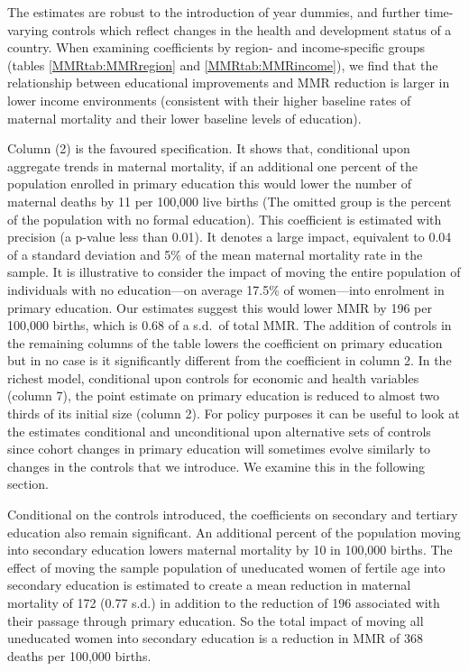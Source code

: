 \documentclass{article}[12pt,subeqn]
\begin{document}
\begin{spacing}{1.4}
The estimates are robust to the introduction of year dummies, and further 
time-varying controls which reflect changes in the health and development status 
of a country. When examining coefficients by region- and income-specific groups 
(tables \ref{MMRtab:MMRregion} and \ref{MMRtab:MMRincome}), we find that the 
relationship between educational improvements and MMR reduction is larger in lower 
income environments (consistent with their higher baseline rates of maternal 
mortality and their lower baseline levels of education).

Column (2) is the favoured specification. It shows that, conditional upon 
aggregate trends in maternal mortality, if an additional one percent of the 
population enrolled in primary education this would lower the number of maternal 
deaths by 11 per 100,000 live births (The omitted group is the percent of the
population with no formal education). This coefficient is estimated with 
precision (a p-value less than 0.01). It denotes a large impact, equivalent to 
0.04 of a standard deviation and 5\% of the mean maternal mortality rate in the 
sample. It is illustrative to consider the impact of moving the entire population 
of individuals with no education---on average 17.5\% of women---into enrolment in 
primary education. Our estimates suggest this would lower MMR by 196 per 100,000 
births, which is 0.68 of a s.d.\ of total MMR. The addition of controls in the 
remaining columns of the table lowers the coefficient on primary education but in 
no case is it significantly different from the coefficient in column 2. In the 
richest model, conditional upon controls for economic and health variables (column 
7), the point estimate on primary education is reduced to almost two thirds of its 
initial size (column 2). For policy purposes it can be useful to look at the 
estimates conditional and unconditional upon alternative sets of controls since 
cohort changes in primary education will sometimes evolve similarly to changes in 
the controls that we introduce. We examine this in the following section.

Conditional on the controls introduced, the coefficients on secondary and tertiary 
education also remain significant. An additional percent of the population moving 
into secondary education lowers maternal mortality by 10 in 100,000 births. The 
effect of moving the sample population of uneducated women of fertile age into 
secondary education is estimated to create a mean reduction in maternal mortality 
of 172 (0.77 s.d.) in addition to the reduction of 196 associated with their passage 
through primary education. So the total impact of moving all uneducated women into 
secondary education is a reduction in MMR of 368 deaths per 100,000 births.


\end{spacing}
\end{document}
